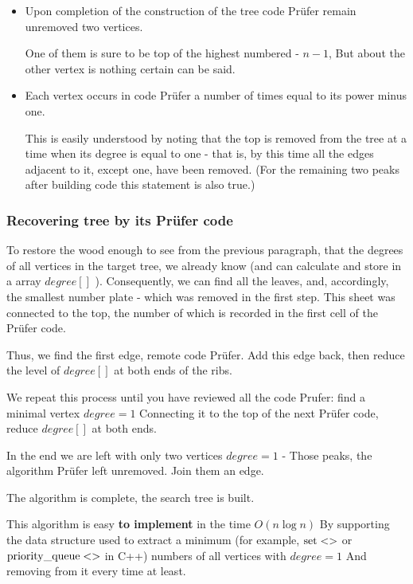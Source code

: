\begin{itemize}

\item Upon completion of the construction of the tree code Prüfer remain unremoved two vertices.

One of them is sure to be top of the highest numbered - $n-1$, But about the other vertex is nothing certain can be said.

\item Each vertex occurs in code Prüfer a number of times equal to its power minus one.

This is easily understood by noting that the top is removed from the tree at a time when its degree is equal to one - that is, by this time all the edges adjacent to it, except one, have been removed. (For the remaining two peaks after building code this statement is also true.)

\end{itemize}

\subsubsection{ Recovering tree by its Prüfer code }

To restore the wood enough to see from the previous paragraph, that the degrees of all vertices in the target tree, we already know (and can calculate and store in a array $degree []$ ). Consequently, we can find all the leaves, and, accordingly, the smallest number plate - which was removed in the first step. This sheet was connected to the top, the number of which is recorded in the first cell of the Prüfer code.

Thus, we find the first edge, remote code Prüfer. Add this edge back, then reduce the level of $degree []$ at both ends of the ribs.

We repeat this process until you have reviewed all the code Prufer: find a minimal vertex $degree = 1$ Connecting it to the top of the next Prüfer code, reduce $degree []$ at both ends.

In the end we are left with only two vertices $degree = 1$ - Those peaks, the algorithm Prüfer left unremoved. Join them an edge.

The algorithm is complete, the search tree is built.

This algorithm is easy \textbf{to implement} in the time $O (n \log n)$ By supporting the data structure used to extract a minimum (for example, $\rm set <>$ or $\rm priority \_queue <>$ in C++) numbers of all vertices with $degree = 1$ And removing from it every time at least.

